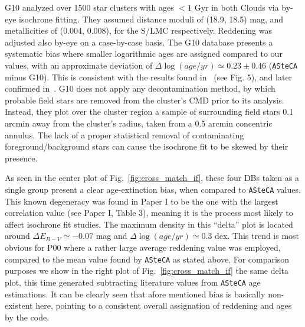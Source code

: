 \documentclass{aa}
\begin{document}
G10 analyzed over 1500 star clusters with ages ${<}1$ Gyr in both Clouds via
by-eye isochrone fitting. They assumed distance moduli of (18.9, 18.5) mag, and
metallicities of (0.004, 0.008), for the S/LMC respectively. Reddening was
adjusted also by-eye on a case-by-case basis.
The G10 database presents a systematic bias where smaller logarithmic ages are
assigned compared to our values, with an approximate deviation of $\Delta
\log(age/yr){\simeq}0.23\pm0.46$ (\texttt{ASteCA} minus G10). This is consistent
with the results found in~\cite{Choudhury_2015} (see Fig. 5), and later
confirmed in~\cite{Piatti_2015a,Piatti_2015b}.
%
G10 does not apply any decontamination method, by which probable field stars are
removed from the cluster's CMD prior to its analysis. Instead, they plot over
the cluster region a sample of surrounding field stars 0.1 arcmin away from the
cluster's radius, taken from a 0.5 arcmin concentric annulus. The lack of a
proper statistical removal of contaminating foreground/background stars can
cause the isochrone fit to be skewed by their presence.

%
As seen in the center plot of Fig.~\ref{fig:cross_match_if}, these four DBs
taken as a single group present a clear age-extinction bias, when compared
to \texttt{ASteCA} values. This known degeneracy was found in Paper I to be
the one with the largest correlation value (see Paper I, Table 3), meaning it is
the process most likely to affect isochrone fit studies.
The maximum density in this ``delta'' plot is located around
$\Delta E_{B-V}{\simeq-}0.07$ mag and $\Delta \log(age/yr){\simeq}0.3$ dex.
This trend is most obvious for P00 where a rather large average reddening
value was employed, compared to the mean value found by \texttt{ASteCA} as
stated above.
%
For comparison purposes we show in the right plot of
Fig.~\ref{fig:cross_match_if} the same delta plot, this time generated
subtracting literature values from \texttt{ASteCA} age estimations. It can 
be clearly seen that afore mentioned bias is basically non-existent here,
pointing to a consistent overall assignation of reddening and ages by
the code.
\end{document}
